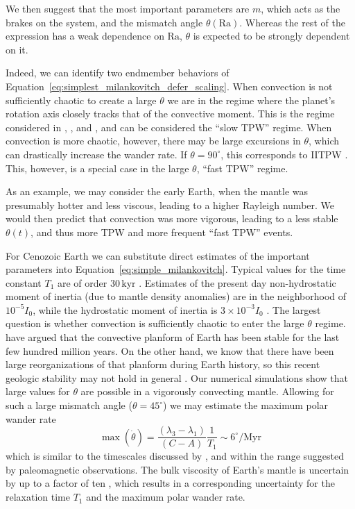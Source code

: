 \documentclass[extra,mreferee]{gji}
\begin{document}
We then suggest that the most important parameters are $m$, which acts as the brakes on the system, and the mismatch angle $\theta(\mathrm{Ra})$.
Whereas the rest of the expression has a weak dependence on $\mathrm{Ra}$, $\theta$ is expected to be strongly dependent on it.

Indeed, we can identify two endmember behaviors of Equation~\eqref{eq:simplest_milankovitch_defer_scaling}.
When convection is not sufficiently chaotic to create a large $\theta$ we are in the regime where the planet's rotation axis closely tracks that of the convective moment.
This is the regime considered in \citet{steinberger1997changes}, \citet{roberts2007cause}, and \citet{zhong2007supercontinent}, and can be considered the ``slow TPW'' regime.
When convection is more chaotic, however, there may be large excursions in $\theta$, which can drastically increase the wander rate.  
If $\theta=90^\circ$, this corresponds to IITPW \citep{kirschvink1997evidence}.  
This, however, is a special case in the large $\theta$, ``fast TPW'' regime.

As an example, we may consider the early Earth, when the mantle was presumably hotter and less viscous, leading to a 
higher Rayleigh number. We would then predict that convection was more vigorous, leading to 
a less stable $\theta(t)$, and thus more TPW and more frequent ``fast TPW'' events.

For Cenozoic Earth we can substitute direct estimates of the important parameters into Equation~\eqref{eq:simple_milankovitch}.
Typical values for the time constant $T_1$ are of order $30 \, \mathrm{kyr}$ \citep{ricard1993polar}.
Estimates of the present day non-hydrostatic moment of inertia (due to mantle density anomalies)
are in the neighborhood of $10^{-5} I_0$, while the hydrostatic moment of inertia is $3 \times 10^{-3} I_0$ \citep{chambat2001mean}.
The largest question is whether convection is sufficiently chaotic to enter the large $\theta$ regime. 
\citet{richards1997explanation} have argued that the convective planform of Earth has been stable for the last
few hundred million years. On the other hand, we know that there have been large reorganizations of that planform 
during Earth history, so this recent geologic stability may not hold in general \citep{evans2003true}.
Our numerical simulations show that large values for $\theta$ are possible in a vigorously convecting mantle.
Allowing for such a large mismatch angle ($\theta = 45^\circ$) we may estimate the maximum polar wander rate
\begin{equation}
\max ( \dot{\theta} ) = \frac{(\lambda_3-\lambda_1)}{(C-A)}\frac{1}{T_1} \sim 6^\circ / \mathrm{Myr}
\end{equation}
which is similar to the timescales discussed by \citet{cambiotti2011new}, and within the range 
suggested by paleomagnetic observations.
The bulk viscosity of Earth's mantle is uncertain by up to a factor of ten \citep{mitrovica2004new},
which results in a corresponding uncertainty for the relaxation time $T_1$ and the maximum polar wander rate.
\end{document}

